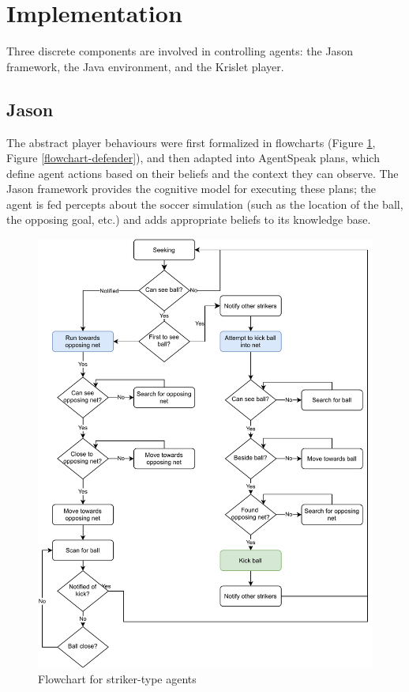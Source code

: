 \documentclass[conference]{IEEEtran}
\begin{document}
	
	\section{Implementation}
	Three discrete components are involved in controlling agents: the Jason framework, the Java environment, and the Krislet player. 
	
	\subsection{Jason}
	The abstract player behaviours were first formalized in flowcharts (Figure \ref{flowchart-striker}, Figure  \ref{flowchart-defender}), and then adapted into AgentSpeak plans, which define agent actions based on their beliefs and the context they can observe. The Jason framework provides the cognitive model for executing these plans; the agent is fed percepts about the soccer simulation (such as the location of the ball, the opposing goal, etc.) and adds appropriate beliefs to its knowledge base.
	
	\begin{figure}[ht]
		\centering
		\includegraphics[scale=0.5]{fig/striker-flowchart.pdf}
		\caption{Flowchart for striker-type agents}
		\label{flowchart-striker}
	\end{figure}
	
\end{document}
